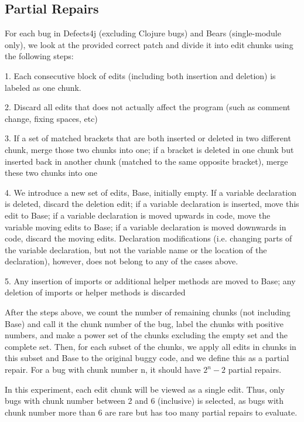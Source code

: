 \documentclass[sigconf, timestamp-false, anonymous=true]{acmart}
\begin{document}
\subsection{Partial Repairs}

For each bug in Defects4j (excluding Clojure bugs) and Bears (single-module only), 
we look at the provided correct patch and divide it 
into edit chunks using the following steps:

1. Each consecutive block of edits (including both insertion and deletion) 
is labeled as one chunk.

2. Discard all edits that does not actually affect the program 
(such as comment change, fixing spaces, etc)

3. If a set of matched brackets that are both inserted or deleted in two different 
chunk, merge those two chunks into one; if a bracket is deleted in one chunk but 
inserted back in another chunk (matched to the same opposite bracket), merge these 
two chunks into one

4. We introduce a new set of edits, Base, initially empty. If a variable declaration 
is deleted, discard the deletion edit; if a variable declaration is inserted, move this
 edit to Base; if a variable declaration is moved upwards in code, move the variable 
moving edits to Base; if a variable declaration is moved downwards in code, 
discard the moving edits. Declaration modifications (i.e. changing parts of the 
variable declaration, but not the variable name or the location of the declaration), 
however, does not belong to any of the cases above.

5. Any insertion of imports or additional helper methods are moved to Base; 
any deletion of imports or helper methods is discarded

After the steps above, we count the number of remaining chunks (not including Base) 
and call it the chunk number of the bug, label the chunks with positive numbers, and 
make a power set of the chunks excluding the empty set and the complete set. 
Then, for each subset of the chunks, we apply all edits in chunks in this subset 
and Base to the original buggy code, and we define this as a partial repair. 
For a bug with chunk number n, it should have $2^n-2$ partial repairs. 

In this experiment, each edit chunk will be viewed as a single edit. Thus, only bugs 
with chunk number between 2 and 6 (inclusive) is selected, as bugs with chunk number 
more than 6 are rare but has too many partial repairs to evaluate.
\end{document}

